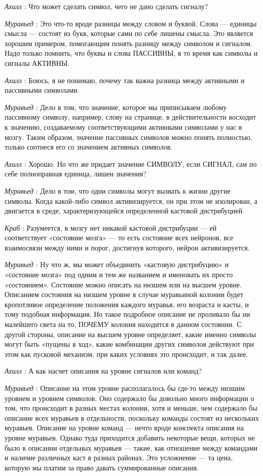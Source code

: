 \documentclass[../main.tex]{subfiles}
\begin{document}
\begin{dialogue}
\emph{Ахилл} : Что может сделать символ, чего не дано сделать сигналу?

\emph{Муравьед} : Это что-то вроде разницы между словом и буквой. Слова --- единицы смысла --- состоят из букв, которые сами по себе лишены смысла. Это является хорошим примером, помогающим понять разницу между символом и сигналом. Надо только помнить, что буквы и слова ПАССИВНЫ, в то время как символы и сигналы АКТИВНЫ.

\emph{Ахилл} : Боюсь, я не понимаю, почему так важна разница между активными и пассивными символами.

\emph{Муравьед} : Дело в том, что значение, которое мы приписываем любому пассивному символу, например, слову на странице, в действительности восходит к значению, создаваемому соответствующими активными символами у нас в мозгу. Таким образом, значение пассивных символов можно понять полностью, только соотнеся его со значением активных символов.

\emph{Ахилл} : Хорошо. Но что же придает значение СИМВОЛУ, если СИГНАЛ, сам по себе полноправная единица, лишен значения?

\emph{Муравьед} : Дело в том, что одни символы могут вызвать к жизни другие символы. Когда какой-либо символ активизируется, он при этом не изолирован, а двигается в среде, характеризующейся определенной кастовой дистрибуцией.

\emph{Краб} : Разумеется, в мозгу нет никакой кастовой дистрибуции --- ей соответствует «состояние мозга» --- то есть состояние всех нейронов, все взаимосвязи между ними и порог, достигнув которого, нейрон активизируется.

\emph{Муравьед} : Ну что ж, мы может объединить «кастовую дистрибуцию» и «состояние мозга» под одним и тем же названием и именовать их просто «состоянием». Состояние можно описать на низшем или на высшем уровне. Описанием состояния на низшем уровне в случае муравьиной колонии будет кропотливое определение положения каждого муравья, его возраста и касты, и тому подобная информация. Но такое подробное описание не проливало бы ни малейшего света на то, ПОЧЕМУ колония находится в данном состоянии. С другой стороны, описание на высшем уровне определяет, какие именно символы могут быть «пущены в ход», какие комбинации других символов действуют при этом как пусковой механизм, при каких условиях это происходит, и так далее.

\emph{Ахилл} : А как насчет описания на уровне сигналов или команд?

\emph{Муравьед} : Описание на этом уровне располагалось бы где-то между низшим уровнем и уровнем символов. Оно содержало бы довольно много информации о том, что происходит в разных местах колонии, хотя и меньше, чем содержало бы описание всех муравьев в отдельности, поскольку команды состоят из нескольких муравьев. Описание на уровне команд --- нечто вроде конспекта описания на уровне муравьев. Однако туда приходится добавить некоторые вещи, которых не было в описании отдельных муравьев --- такие, как отношение между командами и наличие различных каст в разных районах. Это усложнение --- та цена, которую мы платим за право давать суммированные описания.


\end{dialogue}
\end{document}
